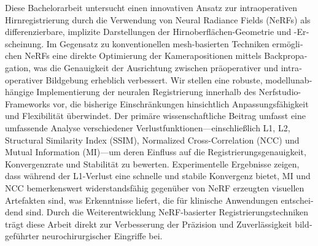 \begin{otherlanguage}{ngerman}
    Diese Bachelorarbeit untersucht einen innovativen Ansatz zur intraoperativen Hirnregistrierung durch die Verwendung von Neural Radiance Fields (NeRFs) als differenzierbare, implizite Darstellungen der Hirnoberflächen-Geometrie und -Erscheinung. Im Gegensatz zu konventionellen mesh-basierten Techniken ermöglichen NeRFs eine direkte Optimierung der Kamerapositionen mittels Backpropagation, was die Genauigkeit der Ausrichtung zwischen präoperativer und intraoperativer Bildgebung erheblich verbessert. Wir stellen eine robuste, modellunabhängige Implementierung der neuralen Registrierung innerhalb des Nerfstudio-Frameworks vor, die bisherige Einschränkungen hinsichtlich Anpassungsfähigkeit und Flexibilität überwindet. Der primäre wissenschaftliche Beitrag umfasst eine umfassende Analyse verschiedener Verlustfunktionen—einschließlich L1, L2, Structural Similarity Index (SSIM), Normalized Cross-Correlation (NCC) und Mutual Information (MI)—um deren Einfluss auf die Registrierungsgenauigkeit, Konvergenzrate und Stabilität zu bewerten. Experimentelle Ergebnisse zeigen, dass während der L1-Verlust eine schnelle und stabile Konvergenz bietet, MI und NCC bemerkenswert widerstandsfähig gegenüber von NeRF erzeugten visuellen Artefakten sind, was Erkenntnisse liefert, die für klinische Anwendungen entscheidend sind. Durch die Weiterentwicklung NeRF-basierter Registrierungstechniken trägt diese Arbeit direkt zur Verbesserung der Präzision und Zuverlässigkeit bildgeführter neurochirurgischer Eingriffe bei.
\end{otherlanguage}


\makeatletter
{}
{\renewcommand{\abstractname}{Abstract}}
{\renewcommand{\abstractname}{Kurzfassung}}
\makeatother